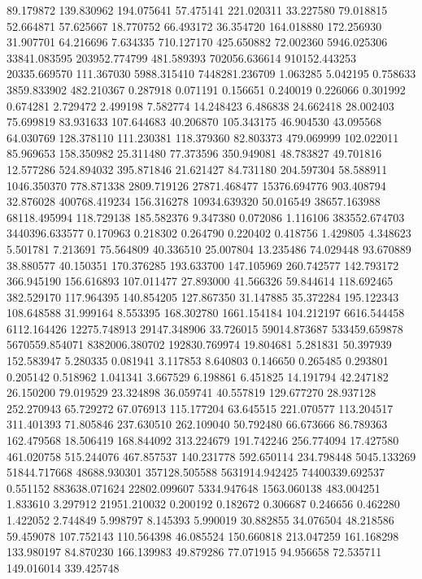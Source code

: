 89.179872
139.830962
194.075641
57.475141
221.020311
33.227580
79.018815
52.664871
57.625667
18.770752
66.493172
36.354720
164.018880
172.256930
31.907701
64.216696
7.634335
710.127170
425.650882
72.002360
5946.025306
33841.083595
203952.774799
481.589393
702056.636614
910152.443253
20335.669570
111.367030
5988.315410
7448281.236709
1.063285
5.042195
0.758633
3859.833902
482.210367
0.287918
0.071191
0.156651
0.240019
0.226066
0.301992
0.674281
2.729472
2.499198
7.582774
14.248423
6.486838
24.662418
28.002403
75.699819
83.931633
107.644683
40.206870
105.343175
46.904530
43.095568
64.030769
128.378110
111.230381
118.379360
82.803373
479.069999
102.022011
85.969653
158.350982
25.311480
77.373596
350.949081
48.783827
49.701816
12.577286
524.894032
395.871846
21.621427
84.731180
204.597304
58.588911
1046.350370
778.871338
2809.719126
27871.468477
15376.694776
903.408794
32.876028
400768.419234
156.316278
10934.639320
50.016549
38657.163988
68118.495994
118.729138
185.582376
9.347380
0.072086
1.116106
383552.674703
3440396.633577
0.170963
0.218302
0.264790
0.220402
0.418756
1.429805
4.348623
5.501781
7.213691
75.564809
40.336510
25.007804
13.235486
74.029448
93.670889
38.880577
40.150351
170.376285
193.633700
147.105969
260.742577
142.793172
366.945190
156.616893
107.011477
27.893000
41.566326
59.844614
118.692465
382.529170
117.964395
140.854205
127.867350
31.147885
35.372284
195.122343
108.648588
31.999164
8.553395
168.302780
1661.154184
104.212197
6616.544458
6112.164426
12275.748913
29147.348906
33.726015
59014.873687
533459.659878
5670559.854071
8382006.380702
192830.769974
19.804681
5.281831
50.397939
152.583947
5.280335
0.081941
3.117853
8.640803
0.146650
0.265485
0.293801
0.205142
0.518962
1.041341
3.667529
6.198861
6.451825
14.191794
42.247182
26.150200
79.019529
23.324898
36.059741
40.557819
129.677270
28.937128
252.270943
65.729272
67.076913
115.177204
63.645515
221.070577
113.204517
311.401393
71.805846
237.630510
262.109040
50.792480
66.673666
86.789363
162.479568
18.506419
168.844092
313.224679
191.742246
256.774094
17.427580
461.020758
515.244076
467.857537
140.231778
592.650114
234.798448
5045.133269
51844.717668
48688.930301
357128.505588
5631914.942425
74400339.692537
0.551152
883638.071624
22802.099607
5334.947648
1563.060138
483.004251
1.833610
3.297912
21951.210032
0.200192
0.182672
0.306687
0.246656
0.462280
1.422052
2.744849
5.998797
8.145393
5.990019
30.882855
34.076504
48.218586
59.459078
107.752143
110.564398
46.085524
150.660818
213.047259
161.168298
133.980197
84.870230
166.139983
49.879286
77.071915
94.956658
72.535711
149.016014
339.425748
